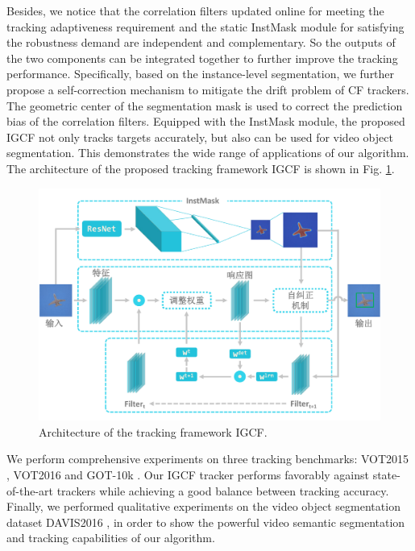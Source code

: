 Besides, we notice that the correlation filters updated online for meeting the tracking adaptiveness requirement and the static InstMask module for satisfying the robustness demand are independent and complementary. So the outputs of the two components can be integrated together to further improve the tracking performance. Specifically, based on the instance-level segmentation, we further propose a self-correction mechanism to mitigate the drift problem of CF trackers. The geometric center of the segmentation mask is used to correct the prediction bias of the correlation filters. Equipped with the InstMask module, the proposed IGCF not only tracks targets accurately, but also can be used for video object segmentation. This demonstrates the wide range of applications of our algorithm. The architecture of the proposed tracking framework IGCF is shown in Fig. \ref{fig:IGCF}.

\begin{figure}
    \centering
    \includegraphics[width=1.0\textwidth]{Img/IGCF/instmask1.pdf}
    \caption{Architecture of the tracking framework IGCF.}
    \label{fig:IGCF}
\end{figure}

We perform comprehensive experiments on three tracking benchmarks: VOT2015 \cite{Kristan2015TheVO}, VOT2016 \cite{Kristan2016TheVO} and GOT-10k \cite{GOT-10k}. Our IGCF tracker performs favorably against state-of-the-art trackers while achieving a good balance between tracking accuracy. Finally, we performed qualitative experiments on the video object segmentation dataset DAVIS2016 \cite{Perazzi2016}, in order to show the powerful video semantic segmentation and tracking capabilities of our algorithm.

